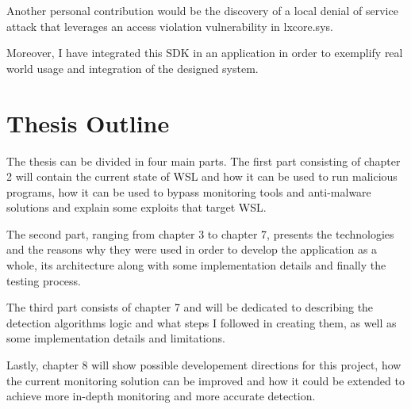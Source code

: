         Another personal contribution would be the discovery of a local denial of service attack that leverages an access violation vulnerability
        in lxcore.sys.

        Moreover, I have integrated this SDK in an application in order to exemplify real world usage and integration of the designed
        system. 
        
    \section{Thesis Outline}
        The thesis can be divided in four main parts. The first part consisting of chapter 2 will contain the current state of WSL and how it can
        be used to run malicious programs, how it can be used to bypass monitoring tools and anti-malware solutions and explain some exploits
        that target WSL.

        The second part, ranging from chapter 3 to chapter 7, presents the technologies and the reasons why they were used in order to
        develop the application as a whole, its architecture along with some implementation details and finally the testing process.

        The third part consists of chapter 7 and will be dedicated to describing the detection algorithms logic and what steps I followed in
        creating them, as well as some implementation details and limitations.

        Lastly, chapter 8 will show possible developement directions for this project, how the current monitoring solution can be improved and
        how it could be extended to achieve more in-depth monitoring and more accurate detection.
        